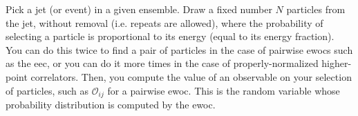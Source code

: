 Pick a jet (or event) in a given ensemble.
%
Draw a fixed number \(N\) particles from the jet, without removal (i.e. repeats are allowed), where the probability of selecting a particle is proportional to its energy (equal to its energy fraction).
%
You can do this twice to find a pair of particles in the case of pairwise \glspl{ewoc} such as the \gls{eec}, or you can do it more times in the case of properly-normalized higher-point correlators.
%
Then, you compute the value of an observable on your selection of particles, such as \(\mathcal{O}_{ij}\) for a pairwise \gls{ewoc}.
%
This is the random variable whose probability distribution is computed by the \gls{ewoc}.






